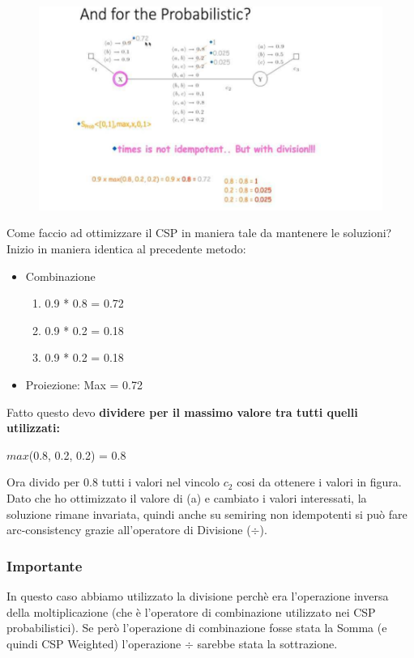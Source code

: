 \begin{figure}[htp]
	\centering
    \includegraphics[width=14cm, keepaspectratio]{img/Cap5/Probabilistic2.png}
\end{figure}

Come faccio ad ottimizzare il CSP in maniera tale da mantenere le soluzioni?
\\Inizio in maniera identica al precedente metodo:
\begin{itemize}
    \item Combinazione
    \begin{enumerate}
        \item 0.9 * 0.8 = 0.72
        \item 0.9 * 0.2 = 0.18
        \item 0.9 * 0.2 = 0.18
    \end{enumerate}
    \item Proiezione: Max = 0.72
\end{itemize}
\noindent Fatto questo devo \textbf{dividere per il massimo valore tra tutti quelli utilizzati:}
\begin{center}
    $max$(0.8, 0.2, 0.2) = 0.8
\end{center}
Ora divido per 0.8 tutti i valori nel vincolo $c_2$ cosi da ottenere i valori in figura. Dato che ho ottimizzato il valore di (a) e cambiato i valori interessati, la soluzione rimane invariata, quindi anche su semiring non idempotenti si può fare arc-consistency grazie all'operatore di Divisione ($\div$).

\subsubsection{\textbf{Importante}}
In questo caso abbiamo utilizzato la divisione perchè era l'operazione inversa della moltiplicazione (che è l’operatore di combinazione utilizzato nei CSP probabilistici). Se però l’operazione di combinazione fosse stata la Somma (e quindi CSP Weighted) l’operazione $\div$ sarebbe stata la sottrazione.


